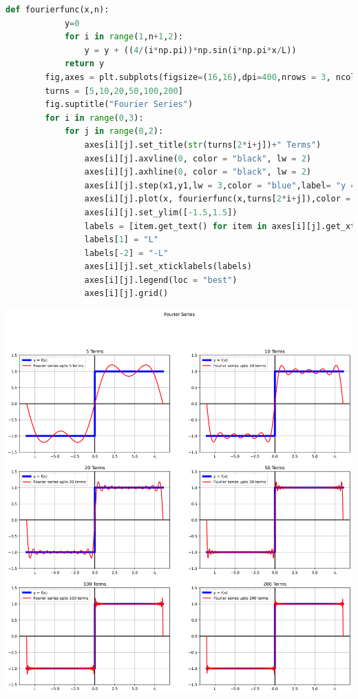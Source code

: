 \documentclass[addpoints]{exam}
\begin{document}
\begin{questions}
\begin{solution}
\begin{lstlisting}[language = python]
        def fourierfunc(x,n):
            y=0
            for i in range(1,n+1,2):
                y = y + ((4/(i*np.pi))*np.sin(i*np.pi*x/L))
            return y
        fig,axes = plt.subplots(figsize=(16,16),dpi=400,nrows = 3, ncols = 2)
        turns = [5,10,20,50,100,200]
        fig.suptitle("Fourier Series")
        for i in range(0,3):
            for j in range(0,2):
                axes[i][j].set_title(str(turns[2*i+j])+" Terms")
                axes[i][j].axvline(0, color = "black", lw = 2)
                axes[i][j].axhline(0, color = "black", lw = 2)
                axes[i][j].step(x1,y1,lw = 3,color = "blue",label= "y = f(x) ")
                axes[i][j].plot(x, fourierfunc(x,turns[2*i+j]),color = "red",lw =2, label = "Fourier series upto "+str(turns[2*i+j])+" terms")
                axes[i][j].set_ylim([-1.5,1.5])
                labels = [item.get_text() for item in axes[i][j].get_xticklabels()]
                labels[1] = "L"
                labels[-2] = "-L"
                axes[i][j].set_xticklabels(labels)
                axes[i][j].legend(loc = "best")
                axes[i][j].grid()
    \end{lstlisting}
     \includegraphics[width = 6.0in]{output_3_1.png}
\end{solution}

\end{questions}
\end{document}
